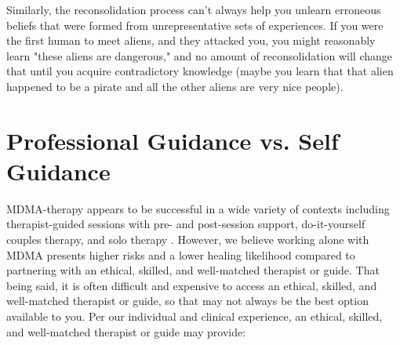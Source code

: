 \documentclass[12pt,letterpaper]{book}
\begin{document}
\begin{itemize}
        Similarly, the reconsolidation process can't always help you unlearn erroneous beliefs that were formed from unrepresentative sets of experiences. If you were the first human to meet aliens, and they attacked you, you might reasonably learn "these aliens are dangerous," and no amount of reconsolidation will change that until you acquire contradictory knowledge (maybe you learn that that alien happened to be a pirate and all the other aliens are very nice people).
\end{itemize}

\section{Professional Guidance vs. Self Guidance}
\label{professionalVSSelf}
MDMA-therapy appears to be successful in a wide variety of contexts including therapist-guided sessions with pre- and post-session support, do-it-yourself couples therapy, and solo therapy \cite{mitchellMDMAClinicalTrial2,colbertEvenings,hillsSolo}. However, we believe working alone with MDMA presents higher risks and a lower healing likelihood compared to partnering with an ethical, skilled, and well-matched therapist or guide. That being said, it is often difficult and expensive to access an ethical, skilled, and well-matched therapist or guide, so that may not always be the best option available to you. Per our individual and clinical experience, an ethical, skilled, and well-matched therapist or guide may provide:
\end{document}

